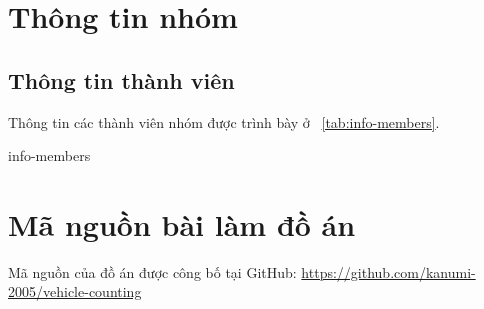 \section{Thông tin nhóm}

\subsection{Thông tin thành viên}
Thông tin các thành viên nhóm được trình bày ở
\tablename~\ref{tab:info-members}.

{info-members}

\section{Mã nguồn bài làm đồ án}
Mã nguồn của đồ án được công bố tại GitHub:
\url{https://github.com/kanumi-2005/vehicle-counting}
